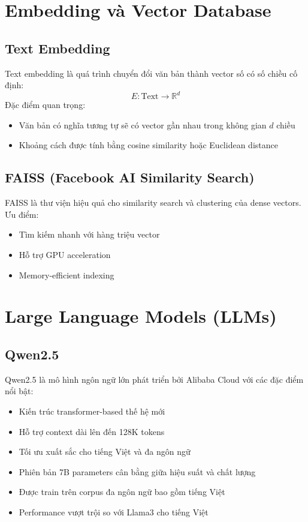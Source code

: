 \documentclass[12pt,a4paper]{report}
\begin{document}
\section{Embedding và Vector Database}

\subsection{Text Embedding}

Text embedding là quá trình chuyển đổi văn bản thành vector số có số chiều cố định:
\[
E : \text{Text} \rightarrow \mathbb{R}^d
\]
Đặc điểm quan trọng:
\begin{itemize}
    \item Văn bản có nghĩa tương tự sẽ có vector gần nhau trong không gian $d$ chiều
    \item Khoảng cách được tính bằng cosine similarity hoặc Euclidean distance
\end{itemize}

\subsection{FAISS (Facebook AI Similarity Search)}

FAISS là thư viện hiệu quả cho similarity search và clustering của dense vectors. Ưu điểm:
\begin{itemize}
    \item Tìm kiếm nhanh với hàng triệu vector
    \item Hỗ trợ GPU acceleration
    \item Memory-efficient indexing
\end{itemize}

\section{Large Language Models (LLMs)}

\subsection{Qwen2.5}

Qwen2.5 là mô hình ngôn ngữ lớn phát triển bởi Alibaba Cloud với các đặc điểm nổi bật:
\begin{itemize}
    \item Kiến trúc transformer-based thế hệ mới
    \item Hỗ trợ context dài lên đến 128K tokens
    \item Tối ưu xuất sắc cho tiếng Việt và đa ngôn ngữ
    \item Phiên bản 7B parameters cân bằng giữa hiệu suất và chất lượng
    \item Được train trên corpus đa ngôn ngữ bao gồm tiếng Việt
    \item Performance vượt trội so với Llama3 cho tiếng Việt
\end{itemize}
\end{document}
